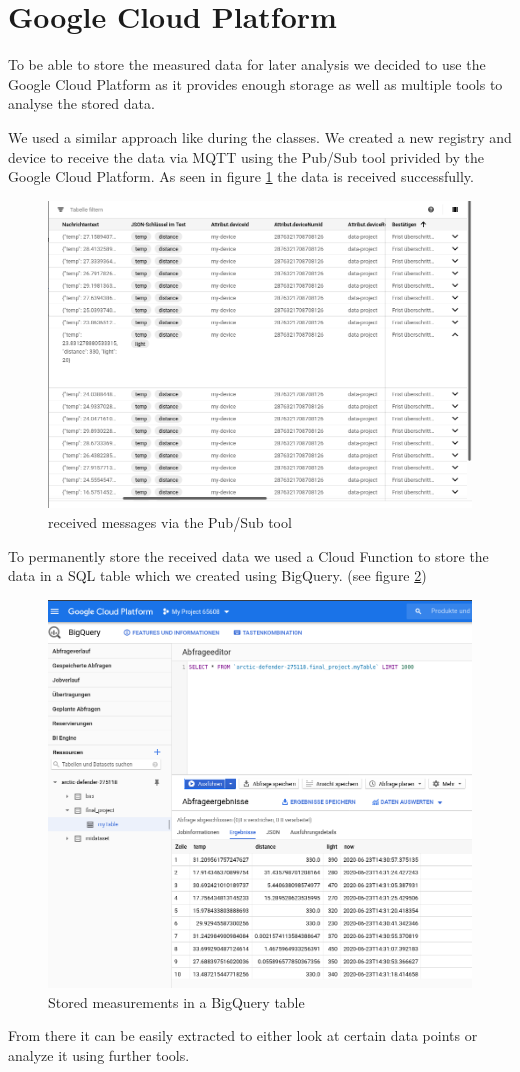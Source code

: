 \documentclass{article}
\begin{document}
\section{Google Cloud Platform}
To be able to store the measured data for later analysis we decided to use the Google Cloud Platform as it provides enough storage as well as multiple tools to analyse the stored data.\par 
We used a similar approach like during the classes. We created a new registry and device to receive the data via MQTT using the Pub/Sub tool privided by the Google Cloud Platform. As seen in figure \ref{pic:messages} the data is received successfully.\par 
\begin{figure}
	\centering
	\includegraphics[scale=0.4]{messages.png}
	\caption{received messages via the Pub/Sub tool}
	\label{pic:messages}
\end{figure}
To permanently store the received data we used a Cloud Function to store the data in a SQL table which we created using BigQuery. (see figure \ref{fig:table})
\begin{figure}
	\centering
	\includegraphics[scale=0.4]{table.png}
	\caption{Stored measurements in a BigQuery table}
	\label{fig:table}
\end{figure}
From there it can be easily extracted to either look at certain data points or analyze it using further tools.
\end{document}
